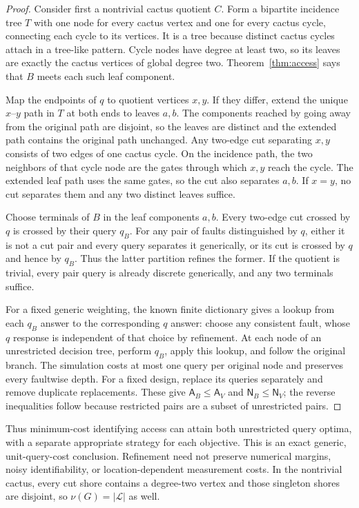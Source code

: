 \documentclass[11pt,letterpaper]{article}
\newcommand{\A}{\mathsf A}
\newcommand{\N}{\mathsf N}
\begin{document}
\begin{proof}
Consider first a nontrivial cactus quotient $C$. Form a bipartite incidence tree $T$ with one node for every cactus vertex and one for every cactus cycle, connecting each cycle to its vertices. It is a tree because distinct cactus cycles attach in a tree-like pattern. Cycle nodes have degree at least two, so its leaves are exactly the cactus vertices of global degree two. Theorem~\ref{thm:access} says that $B$ meets each such leaf component.

Map the endpoints of $q$ to quotient vertices $x,y$. If they differ, extend the unique $x$--$y$ path in $T$ at both ends to leaves $a,b$. The components reached by going away from the original path are disjoint, so the leaves are distinct and the extended path contains the original path unchanged. Any two-edge cut separating $x,y$ consists of two edges of one cactus cycle. On the incidence path, the two neighbors of that cycle node are the gates through which $x,y$ reach the cycle. The extended leaf path uses the same gates, so the cut also separates $a,b$. If $x=y$, no cut separates them and any two distinct leaves suffice.

Choose terminals of $B$ in the leaf components $a,b$. Every two-edge cut crossed by $q$ is crossed by their query $q_B$. For any pair of faults distinguished by $q$, either it is not a cut pair and every query separates it generically, or its cut is crossed by $q$ and hence by $q_B$. Thus the latter partition refines the former. If the quotient is trivial, every pair query is already discrete generically, and any two terminals suffice.

For a fixed generic weighting, the known finite dictionary gives a lookup from each $q_B$ answer to the corresponding $q$ answer: choose any consistent fault, whose $q$ response is independent of that choice by refinement. At each node of an unrestricted decision tree, perform $q_B$, apply this lookup, and follow the original branch. The simulation costs at most one query per original node and preserves every faultwise depth. For a fixed design, replace its queries separately and remove duplicate replacements. These give $\A_B\le\A_V$ and $\N_B\le\N_V$; the reverse inequalities follow because restricted pairs are a subset of unrestricted pairs.
\end{proof}

Thus minimum-cost identifying access can attain both unrestricted query optima, with a separate appropriate strategy for each objective. This is an exact generic, unit-query-cost conclusion. Refinement need not preserve numerical margins, noisy identifiability, or location-dependent measurement costs. In the nontrivial cactus, every cut shore contains a degree-two vertex and those singleton shores are disjoint, so $\nu(G)=|\mathcal L|$ as well.
\end{document}
